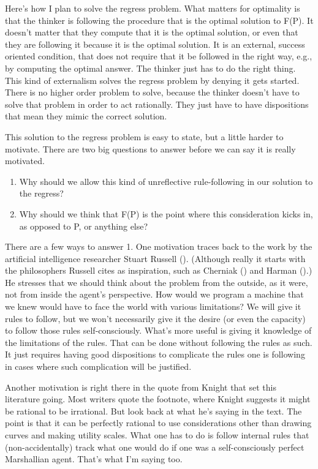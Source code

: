 \documentclass[
  10pt,
  letterpaper,
  twoside]{scrbook}
\providecommand{\tightlist}{%
  \setlength{\itemsep}{0pt}\setlength{\parskip}{0pt}}\usepackage{longtable,booktabs,array}
\begin{document}
Here's how I plan to solve the regress problem. What matters for
optimality is that the thinker is following the procedure that is the
optimal solution to F(P). It doesn't matter that they compute that it is
the optimal solution, or even that they are following it because it is
the optimal solution. It is an external, success oriented condition,
that does not require that it be followed in the right way, e.g., by
computing the optimal answer. The thinker just has to do the right
thing. This kind of externalism solves the regress problem by denying it
gets started. There is no higher order problem to solve, because the
thinker doesn't have to solve that problem in order to act rationally.
They just have to have dispositions that mean they mimic the correct
solution.

This solution to the regress problem is easy to state, but a little
harder to motivate. There are two big questions to answer before we can
say it is really motivated.

\begin{enumerate}
\def\labelenumi{\arabic{enumi}.}
\tightlist
\item
  Why should we allow this kind of unreflective rule-following in our
  solution to the regress?
\item
  Why should we think that F(P) is the point where this consideration
  kicks in, as opposed to P, or anything else?
\end{enumerate}

There are a few ways to answer 1. One motivation traces back to the work
by the artificial intelligence researcher Stuart Russell
(). (Although really it starts with the
philosophers Russell cites as inspiration, such as Cherniak
() and Harman
().) He stresses that we should think
about the problem from the outside, as it were, not from inside the
agent's perspective. How would we program a machine that we knew would
have to face the world with various limitations? We will give it rules
to follow, but we won't necessarily give it the desire (or even the
capacity) to follow those rules self-consciously. What's more useful is
giving it knowledge of the limitations of the rules. That can be done
without following the rules as such. It just requires having good
dispositions to complicate the rules one is following in cases where
such complication will be justified.

Another motivation is right there in the quote from Knight that set this
literature going. Most writers quote the footnote, where Knight suggests
it might be rational to be irrational. But look back at what he's saying
in the text. The point is that it can be perfectly rational to use
considerations other than drawing curves and making utility scales. What
one has to do is follow internal rules that (non-accidentally) track
what one would do if one was a self-consciously perfect Marshallian
agent. That's what I'm saying too.
\end{document}
